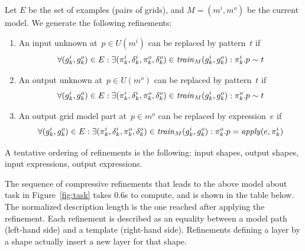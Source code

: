\documentclass[a4paper]{llncs}
\begin{document}
Let $E$ be the set of examples (pairs of grids), and $M = (m^i,m^o)$
be the current model. We generate the following refinements:
\begin{enumerate}
\item An input unknown at~$p \in U(m^i)$ can be replaced by
  pattern~$t$ if
\[ \forall (g^i_k,g^o_k) \in E: \exists (\pi^i_k,\delta^i_k,\pi^o_k,\delta^o_k) \in {\it
    train}_M(g^i_k,g^o_k): \pi^i_k.p \sim t \]
%
\item An output unknown at~$p \in U(m^o)$ can be replaced by
pattern~$t$ if
\[ \forall (g^i_k,g^o_k) \in E: \exists (\pi^i_k,\delta^i_k,\pi^o_k,\delta^o_k) \in {\it
    train}_M(g^i_k,g^o_k): \pi^o_k.p \sim t \]
%
\item An output grid model part at~$p \in m^o$ can be replaced by expression~$e$ if
\[ \forall (g^i_k,g^o_k) \in E: \exists (\pi^i_k,\delta^i_k,\pi^o_k,\delta^o_k) \in {\it
    train}_M(g^i_k,g^o_k): \pi^o_k.p = {\it apply}(e, \pi^i_k) \]
\end{enumerate}


A tentative ordering of refinements is the following: input shapes,
output shapes, input expressions, output expressions.

The sequence of compressive refinements that leads to the above model
about task in Figure~\ref{fig:task} takes 0.6s to compute, and is
shown in the table below. The normalized description length is the one
reached after applying the refinement. Each refinement is described as
an equality between a model path (left-hand side) and a template
(right-hand side). Refinements defining a layer by a shape actually
insert a new layer for that shape.
\end{document}
